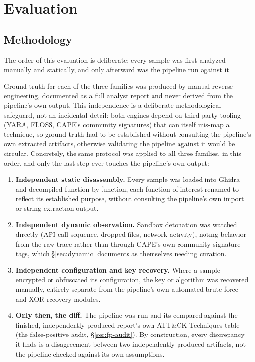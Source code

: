 \section{Evaluation}
\label{sec:evaluation}

\subsection{Methodology}

The order of this evaluation is deliberate: every sample was first
analyzed manually and statically, and only afterward was the pipeline
run against it.

Ground truth for each of the three families was produced by manual
reverse engineering, documented as a full analyst report and never
derived from the pipeline's own output. This independence is a
deliberate methodological safeguard, not an incidental detail: both
engines depend on third-party tooling (YARA, FLOSS, CAPE's community
signatures) that can itself mis-map a technique, so ground truth had to
be established without consulting the pipeline's own extracted
artifacts, otherwise validating the pipeline against it would be
circular. Concretely, the same protocol was applied to all three
families, in this order, and only the last step ever touches the
pipeline's own output:

\begin{enumerate}
  \item \textbf{Independent static disassembly.} Every sample was
    loaded into Ghidra and decompiled function by function, each
    function of interest renamed to reflect its established purpose,
    without consulting the pipeline's own import or string extraction
    output.
  \item \textbf{Independent dynamic observation.} Sandbox detonation
    was watched directly (API call sequence, dropped files, network
    activity), noting behavior from the raw trace rather than through
    CAPE's own community signature tags, which \S\ref{sec:dynamic}
    documents as themselves needing curation.
  \item \textbf{Independent configuration and key recovery.} Where a
    sample encrypted or obfuscated its configuration, the key or
    algorithm was recovered manually, entirely separate from the
    pipeline's own automated brute-force and XOR-recovery modules.
  \item \textbf{Only then, the diff.} The pipeline was run and its
     compared against the finished,
    independently-produced report's own ATT\&CK Techniques table (the
    false-positive audit, \S\ref{sec:fp-audit}). By construction, every
    discrepancy it finds is a disagreement between two
    independently-produced artifacts, not the pipeline checked against
    its own assumptions.
\end{enumerate}

